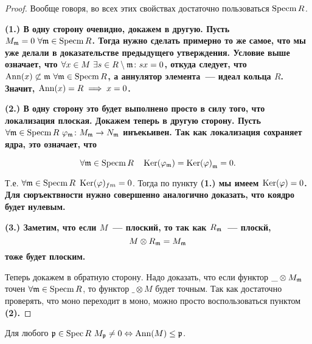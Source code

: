 	\begin{proof}
		Вообще говоря, во всех этих свойствах достаточно пользоваться $\operatorname{Specm}{R}$. 

		\bf{(1.)} В одну сторону очевидно, докажем в другую. Пусть $M_{\mathfrak{m}} = 0 \ \forall \mathfrak{m} \in \operatorname{Specm}{R}$. Тогда нужно сделать примерно то же самое, что мы уже делали в доказательстве предыдущего утверждения. Условие выше означает, что $\forall x \in M \ \exists s \in R \setminus \mathfrak{m}\colon sx = 0$, откуда следует, что $\operatorname{Ann}(x) \not\subset \mathfrak{m} \ \forall \mathfrak{m} \in \operatorname{Specm}{R}$, а аннулятор элемента~--- идеал кольца $R$. Значит, $\operatorname{Ann}(x) = R \implies x = 0$. 

		\bf{(2.)} В одну сторону это будет выполнено просто в силу того, что локализация плоская. Докажем теперь в другую сторону. Пусть $\forall \fm \in \Specm{R} \ \varphi_{\fm}\colon M_{\fm} \to N_{\fm}$ инъекьивен. Так как локализация сохраняет ядра, это означает, что 

		\[
			\forall \fm \in \Specm{R} \quad \Ker\lr*{\varphi_{\fm}} = \Ker\lr*{\varphi}_{\fm} = 0.
		\]

		Т.е. $\forall \fm \in \Specm{R} \ \Ker(\varphi)_{fm} = 0$. Тогда по пункту \bf{(1.)} мы имеем $\Ker\lr*{\varphi} = 0$. Для сюръектвности нужно совершенно аналогично доказать, что коядро будет нулевым. 

		\bf{(3.)} Заметим, что если $M$~--- плоский, то так как $R_{\mathfrak{m}}$~--- плоскй, 
		\[
			M \otimes R_{\mathfrak{m}} = M_{\mathfrak{m}}
		\]
		тоже будет плоским. 

		Теперь докажем в обратную сторону. Надо доказать, что если функтор $\_ \otimes M_{\mathfrak{m}}$ точен $\forall \mathfrak{m} \in \operatorname{Specm}{R}$, то функтор $\_ \otimes M$ будет точным. Так как достаточно проверять, что моно переходит в моно, можно просто воспользоваться пунктом \bf{(2)}. 
	\end{proof}

	\begin{lemma} 
		Для любого $\mathfrak{p} \in \operatorname{Spec}{R} \ M_{\mathfrak{p}} \neq 0 \Leftrightarrow \operatorname{Ann}(M) \le \mathfrak{p}$.
	\end{lemma}

	

	

